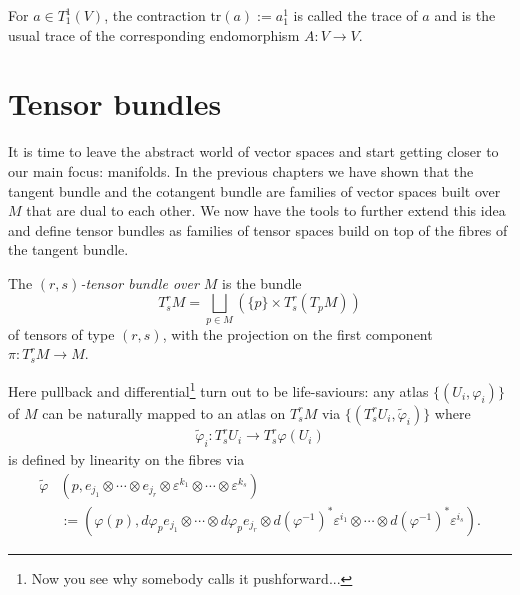 \begin{example}
  For $a\in T_1^1(V)$, the contraction $\mathrm{tr} (a) := a^1_1$ is called the trace of $a$ and is the usual trace of the corresponding endomorphism $A:V\to V$.
\end{example}

\section{Tensor bundles}

It is time to leave the abstract world of vector spaces and start getting closer to our main focus: manifolds.
In the previous chapters we have shown that the tangent bundle and the cotangent bundle are families of vector spaces built over $M$ that are dual to each other.
We now have the tools to further extend this idea and define tensor bundles as families of tensor spaces build on top of the fibres of the tangent bundle.

\begin{definition}
  The \emph{$(r,s)$-tensor bundle over $M$} is the bundle
  \begin{equation}
    T_s^r M = \bigsqcup_{p\in M}\left(\{p\}\times T_s^r(T_p M)\right)
  \end{equation}
  of tensors of type $(r,s)$, with the projection on the first component $\pi:T_s^r M\to M$.
\end{definition}

Here pullback and differential\footnote{Now you see why somebody calls it pushforward...} turn out to be life-saviours:
any atlas $\{(U_i, \varphi_i)\}$ of $M$ can be naturally mapped to an atlas  on $T_s^r M$ via $\{(T_s^r U_i, \widetilde\varphi_i)\}$ where
\begin{align}
  \widetilde\varphi_i : T_s^r U_i \to T_s^r\varphi(U_i)
\end{align}
is defined by linearity on the fibres via
\begin{align}
  \widetilde\varphi & (p, e_{j_1}\otimes\cdots\otimes e_{j_r}\otimes \varepsilon^{k_1}\otimes \cdots\otimes \varepsilon^{k_s})                                                                     \\
                    & :=(\varphi(p), d\varphi_p e_{j_1}\otimes\cdots\otimes d\varphi_p e_{j_r}\otimes d(\varphi^{-1})^*\varepsilon^{i_1}\otimes \cdots\otimes d(\varphi^{-1})^*\varepsilon^{i_s}).
\end{align}

